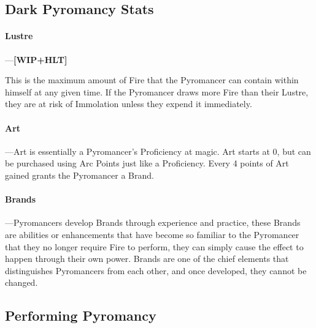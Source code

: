 \documentclass[oneside,11pt,english]{book}
\begin{document}
\subsection{Dark Pyromancy Stats}
\paragraph{Lustre}
---\quad \textbf{[WIP+HLT]}

This is the maximum amount of Fire that the Pyromancer can contain within himself at any given 
time. If the Pyromancer draws more Fire than their Lustre, they are at risk of Immolation unless 
they expend it immediately. 

\paragraph{Art}
---\quad Art is essentially a Pyromancer’s Proficiency at magic. Art starts at 0, but can be purchased 
using Arc Points just like a Proficiency. Every 4 points of Art gained grants the Pyromancer a Brand. 

\paragraph{Brands}
---\quad Pyromancers develop Brands through experience and practice, these Brands are abilities or 
enhancements that have become so familiar to the Pyromancer that they no longer require Fire 
to perform, they can simply cause the effect to happen through their own power. Brands are one 
of the chief elements that distinguishes Pyromancers from each other, and once developed, 
they cannot be changed.

\subsection{Performing Pyromancy}
\end{document}
